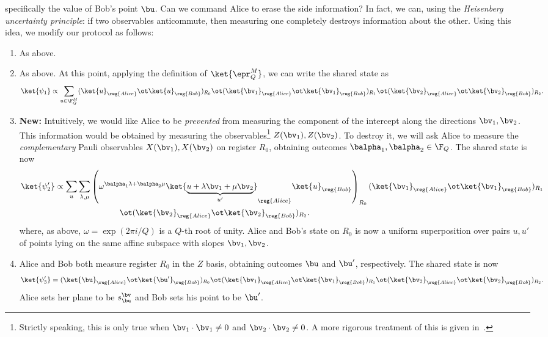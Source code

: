   specifically the value of Bob's point $\bu$. Can we command Alice to
  erase the side information? In fact, we can, using the
  \emph{Heisenberg uncertainty principle}: if two observables
  anticommute, then measuring one completely destroys information
  about the other. Using this idea, we modify our protocol as follows:
  \begin{enumerate}
  \item As above.
  \item As above. At this point,  applying the definition of
    $\ket{\epr_Q^M}$, we can write the shared state as
    \[ \ket{\psi_1} \propto \sum_{u \in \F_Q^M} (\ket{u}_{\reg{Alice}}
      \ot \ket{u}_{\reg{Bob}})_{R_0} \ot
      (\ket{\bv_1}_{\reg{Alice}} \ot \ket{\bv_1}_{\reg{Bob}})_{R_1} \ot
      (\ket{\bv_2}_{\reg{Alice}} \ot \ket{\bv_2}_{\reg{Bob}})_{R_2}. \]
  \item {\bf New:} Intuitively, we would like Alice to be
    \emph{prevented} from measuring the component of the intercept
    along the directions $\bv_1, \bv_2$. This information would be
    obtained by measuring the observables\footnote{Strictly speaking,
      this is only true when $\bv_1 \cdot \bv_1 \neq 0$ and $\bv_2
      \cdot \bv_2 \neq 0$. A more rigorous treatment of this is given
      in~.} $Z(\bv_1), Z(\bv_2)$. To
    destroy it, we will ask Alice to measure the \emph{complementary}
    Pauli observables $X(\bv_1),
    X(\bv_2)$ on register $R_0$, obtaining outcomes $\balpha_1, \balpha_2
    \in \F_Q$. The shared state is now
    \begin{align*}
      \ket{\psi_2'} &\propto \sum_{u} \sum_{\lambda, \mu} \left(
                      \omega^{\balpha_1 \lambda + \balpha_2 \mu}
          \ket{\underbrace{u + \lambda \bv_1 + \mu \bv_2}_{u'}}_{\reg{Alice}}
        \ket{u}_{\reg{Bob}}\right)_{R_0} 
            (\ket{\bv_1}_{\reg{Alice}} \ot
                      \ket{\bv_1}_{\reg{Bob}})_{R_1} \\
      &\qquad\qquad\qquad\qquad\ot
        (\ket{\bv_2}_{\reg{Alice}} \ot \ket{\bv_2}_{\reg{Bob}})_{R_2}.
    \end{align*}
    where, as above, $\omega = \exp(2\pi i / Q)$ is a $Q$-th root of
    unity. Alice and Bob's state on $R_0$ is now a uniform 
    superposition over pairs $u, u'$ of points lying on the same
    affine subspace with slopes $\bv_1, \bv_2$.
  \item Alice and Bob both measure register $R_0$ in the $Z$ basis,
    obtaining outcomes $\bu$ and $\bu'$, respectively. The shared
    state is now
        \[ \ket{\psi_3'} = (\ket{\bu}_{\reg{Alice}} \ot
      \ket{\bu'}_{\reg{Bob}})_{R_0}    \ot  (\ket{\bv_1}_{\reg{Alice}} \ot \ket{\bv_1}_{\reg{Bob}})_{R_1} \ot
      (\ket{\bv_2}_{\reg{Alice}} \ot \ket{\bv_2}_{\reg{Bob}})_{R_2}. \]
Alice sets her
    plane to be $s^{\bv}_{\bu}$ and Bob sets his point to be
    $\bu'$. 
  \end{enumerate}
